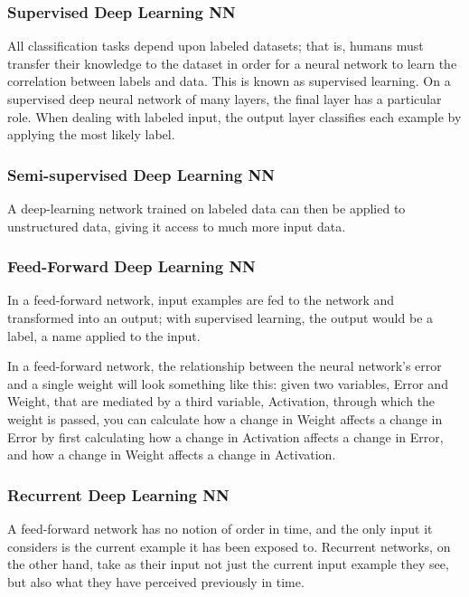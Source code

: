 \documentclass[10pt]{llncs}
\begin{document}
\subsubsection{Supervised Deep Learning NN}
All classification tasks depend upon labeled datasets; that is, humans must transfer their knowledge to the dataset in order for a neural network to learn the correlation between labels and data. This is known as supervised learning. On a supervised deep neural network of many layers, the final layer has a particular role. When dealing with labeled input, the output layer classifies each example by applying the most likely label. 

\subsubsection{Semi-supervised Deep Learning NN}
A deep-learning network trained on labeled data can then be applied to unstructured data, giving it access to much more input data.

\subsubsection{Feed-Forward Deep Learning NN}
In a feed-forward network, input examples are fed to the network and transformed into an output; with supervised learning, the output would be a label, a name applied to the input. 

In a feed-forward network, the relationship between the neural network's error and a single weight will look something like this: given two variables, Error and Weight, that are mediated by a third variable, Activation, through which the weight is passed, you can calculate how a change in Weight affects a change in Error by first calculating how a change in Activation affects a change in Error, and how a change in Weight affects a change in Activation.

\subsubsection{Recurrent  Deep Learning NN}
A feed-forward network has no notion of order in time, and the only input it considers is the current example it has been exposed to. Recurrent networks, on the other hand, take as their input not just the current input example they see, but also what they have perceived previously in time. 
\end{document}
